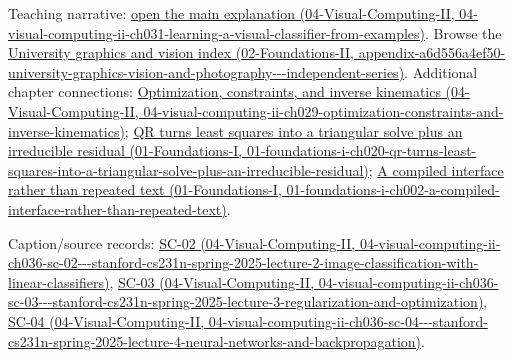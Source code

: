 Teaching narrative: \href{../04-Visual-Computing-II/main.pdf\#nameddest=04-visual-computing-ii-ch031-learning-a-visual-classifier-from-examples}{open the main explanation (04-Visual-Computing-II, 04-visual-computing-ii-ch031-learning-a-visual-classifier-from-examples)}. Browse the \href{../02-Foundations-II/main.pdf\#nameddest=appendix-a6d556a4ef50-university-graphics-vision-and-photography---independent-series}{University graphics and vision index (02-Foundations-II, appendix-a6d556a4ef50-university-graphics-vision-and-photography-\/-\/-independent-series)}. Additional chapter connections: \href{../04-Visual-Computing-II/main.pdf\#nameddest=04-visual-computing-ii-ch029-optimization-constraints-and-inverse-kinematics}{Optimization, constraints, and inverse kinematics (04-Visual-Computing-II, 04-visual-computing-ii-ch029-optimization-constraints-and-inverse-kinematics)}; \href{../01-Foundations-I/main.pdf\#nameddest=01-foundations-i-ch020-qr-turns-least-squares-into-a-triangular-solve-plus-an-irreducible-residual}{QR turns least squares into a triangular solve plus an irreducible residual (01-Foundations-I, 01-foundations-i-ch020-qr-turns-least-squares-into-a-triangular-solve-plus-an-irreducible-residual)}; \href{../01-Foundations-I/main.pdf\#nameddest=01-foundations-i-ch002-a-compiled-interface-rather-than-repeated-text}{A compiled interface rather than repeated text (01-Foundations-I, 01-foundations-i-ch002-a-compiled-interface-rather-than-repeated-text)}.

Caption/source records: \href{../04-Visual-Computing-II/main.pdf\#nameddest=04-visual-computing-ii-ch036-sc-02---stanford-cs231n-spring-2025-lecture-2-image-classification-with-linear-classifiers}{SC-02 (04-Visual-Computing-II, 04-visual-computing-ii-ch036-sc-02-\/-\/-stanford-cs231n-spring-2025-lecture-2-image-classification-with-linear-classifiers)}, \href{../04-Visual-Computing-II/main.pdf\#nameddest=04-visual-computing-ii-ch036-sc-03---stanford-cs231n-spring-2025-lecture-3-regularization-and-optimization}{SC-03 (04-Visual-Computing-II, 04-visual-computing-ii-ch036-sc-03-\/-\/-stanford-cs231n-spring-2025-lecture-3-regularization-and-optimization)}, \href{../04-Visual-Computing-II/main.pdf\#nameddest=04-visual-computing-ii-ch036-sc-04---stanford-cs231n-spring-2025-lecture-4-neural-networks-and-backpropagation}{SC-04 (04-Visual-Computing-II, 04-visual-computing-ii-ch036-sc-04-\/-\/-stanford-cs231n-spring-2025-lecture-4-neural-networks-and-backpropagation)}.
